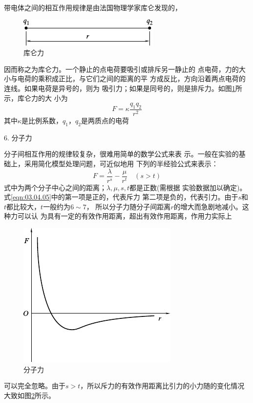 带电体之间的相互作用规律是由法国物理学家库仑发现的，
\begin{figure}
  \includegraphics{figure/fig03.06}
  \caption{库仑力}
  \label{fig:03.06}
\end{figure}
因而称之为库仑力。一个静止的点电荷要吸引或排斥另一静止的
点电荷，力的大小与电荷的乘积成正比，与它们之间的距离的平
方成反比，方向沿着两点电荷的连线。如果电荷是异号的，则为
吸引力；如果是同号的，则是排斥力。如图\ref{fig:03.06}所示，库仑力的大
小为
\begin{equation}\label{eqn:03.04.04}
  F = \kappa \frac { q _ { 1 } q _ { 2 } } { r ^ { 2 } }
\end{equation}
其中$ \kappa $是比例系数，$ q _ { 1 } $，$ q _ { 2 } $是两质点的电荷

\textsf{6. 分子力}

分子间相互作用的规律较复杂，很难用简单的数学公式来表
示。一般在实验的基础上，采用简化模型处理问题，可近似地用
下列的半经验公式来表示：
\begin{equation}\label{eqn:03.04.05}
  F = \frac { \lambda } { r ^ { s } } - \frac { \mu } { r ^ t } \quad \left( s > t \right)
\end{equation}
式中为两个分子中心之间的距离；$\lambda,\mu, s , t $都是正数(需根据
实验数据加以确定)。式\eqref{eqn:03.04.05}中的第一项是正的，代表斥力
第二项是负的，代表引力。由于$ s $和$ t $都比较大，$ t $一般约为$ 6\sim 7 $，
所以分子力随分子间距离$ r $的增大而急剧地减小。这种力可以认
为具有一定的有效作用距离，超出有效作用距离，作用力实际上
\begin{figure}
  \includegraphics{figure/fig03.07}
  \caption{分子力}
  \label{fig:03.07}
\end{figure}
可以完全忽略。由于$ s > t $，所以斥力的有效作用距离比引力的小力随的变化情况大致如图\ref{fig:03.07}所示。

